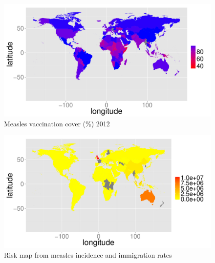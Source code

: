 \documentclass{article}
\begin{document}
\begin{figure}[h!]
\begin{center}
\includegraphics{interimreport1-009}
\end{center}
\caption{Measles vaccination cover (\%) 2012 }
\label{fig:cover12}
\end{figure}

\begin{figure}[h!]
\begin{center}
\includegraphics{interimreport1-010}
\end{center}
\caption{Risk map from measles incidence and immigration rates}
\label{fig:risk12}
\end{figure}
\end{document}

